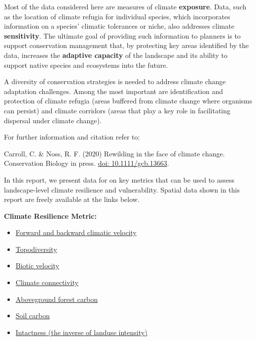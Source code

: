 \documentclass[
]{article}
\providecommand{\tightlist}{%
  \setlength{\itemsep}{0pt}\setlength{\parskip}{0pt}}
\begin{document}
Most of the data considered here are measures of climate
\textbf{exposure}. Data, such as the location of climate refugia for
individual species, which incorporates information on a species'
climatic tolerances or niche, also addresses climate
\textbf{sensitivity}. The ultimate goal of providing such information to
planners is to support conservation management that, by protecting key
areas identified by the data, increases the \textbf{adaptive capacity}
of the landscape and its ability to support native species and
ecosystems into the future.

A diversity of conservation strategies is needed to address climate
change adaptation challenges. Among the most important are
identification and protection of climate refugia (areas buffered from
climate change where organisms can persist) and climate corridors (areas
that play a key role in facilitating dispersal under climate change).

For further information and citation refer to:

Carroll, C. \& Noss, R. F. (2020) Rewilding in the face of climate
change. Conservation Biology in press.
\href{http://dx.doi.org/\%5Bdoi\%5D}{doi: 10.1111/gcb.13663}.

\pagebreak

In this report, we present data for on key metrics that can be used to
assess landscape-level climate resilience and vulnerability. Spatial
data shown in this report are freely available at the links below.

\textbf{Climate Resilience Metric:}

\begin{itemize}
\tightlist
\item
  \href{https://adaptwest.databasin.org/pages/adaptwest-velocitywna}{Forward
  and backward climatic velocity}
\item
  \href{https://adaptwest.databasin.org/pages/environmental-diversity-north-america}{Topodiversity}
\item
  \href{https://adaptwest.databasin.org/pages/climatic-macrorefugia-for-trees-and-songbirds}{Biotic
  velocity}
\item
  \href{https://adaptwest.databasin.org/pages/climate-connectivity-north-america}{Climate
  connectivity}
\item
  \href{http://globbiomass.org/wp-content/uploads/GB_Maps/Globbiomass_global_dataset.html}{Aboveground
  forest carbon}
\item
  \href{https://data.isric.org/geonetwork/srv/eng/catalog.search\#/metadata/c02ddf8b-cbfb-4533-a9c3-7bf0790fd042}{Soil
  carbon}
\item
  \href{https://figshare.com/articles/Global_Human_Modification/7283087}{Intactness
  (the inverse of landuse intensity)}
\end{itemize}
\end{document}
